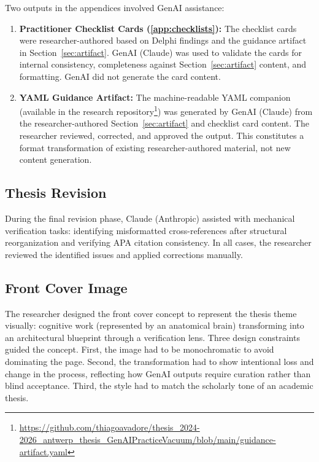 Two outputs in the appendices involved GenAI assistance:

\begin{enumerate}
    \item \textbf{Practitioner Checklist Cards (\ref{app:checklists}):} The checklist cards were
          researcher-authored based on Delphi findings and the guidance artifact in
          Section~\ref{sec:artifact}. GenAI (Claude) was used to validate the cards for internal
          consistency, completeness against Section~\ref{sec:artifact} content, and formatting. GenAI
          did not generate the card content.
    \item \textbf{YAML Guidance Artifact:} The machine-readable YAML companion
          (available in the research repository\footnote{\url{https://github.com/thiagoavadore/thesis_2024-2026_antwerp_thesis_GenAIPracticeVacuum/blob/main/guidance-artifact.yaml}}) was generated by GenAI (Claude) from the
          researcher-authored Section~\ref{sec:artifact} and checklist card content. The researcher
          reviewed, corrected, and approved the output. This constitutes a format
          transformation of existing researcher-authored material, not new content
          generation.
\end{enumerate}

\subsection{Thesis Revision}

During the final revision phase, Claude (Anthropic) assisted with mechanical
verification tasks: identifying misformatted cross-references after structural
reorganization and verifying APA citation consistency. In all cases, the
researcher reviewed the identified issues and applied corrections manually.

\subsection{Front Cover Image}

The researcher designed the front cover concept to represent the thesis theme
visually: cognitive work (represented by an anatomical brain) transforming into
an architectural blueprint through a verification lens. Three design constraints
guided the concept. First, the image had to be monochromatic to avoid dominating
the page. Second, the transformation had to show intentional loss and change in
the process, reflecting how GenAI outputs require curation rather than blind
acceptance. Third, the style had to match the scholarly tone of an academic
thesis.

